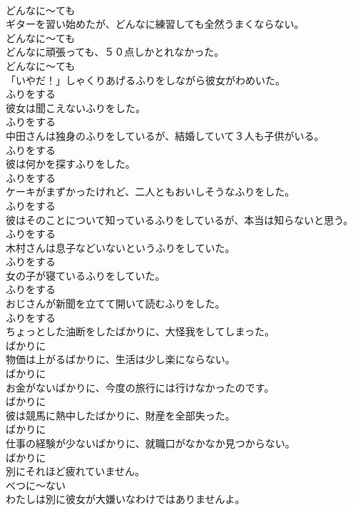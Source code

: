 \documentclass[8pt]{extreport}
\begin{document}
\begin{CJK}{UTF8}{min}
\\	どんなに～ても	
\\	ギターを習い始めたが、どんなに練習しても全然うまくならない。	
\\	どんなに～ても	
\\	どんなに頑張っても、５０点しかとれなかった。	
\\	どんなに～ても	
\\	「いやだ！」しゃくりあげるふりをしながら彼女がわめいた。	
\\	ふりをする	
\\	彼女は聞こえないふりをした。	
\\	ふりをする	
\\	中田さんは独身のふりをしているが、結婚していて３人も子供がいる。	
\\	ふりをする	
\\	彼は何かを探すふりをした。	
\\	ふりをする	
\\	ケーキがまずかったけれど、二人ともおいしそうなふりをした。	
\\	ふりをする	
\\	彼はそのことについて知っているふりをしているが、本当は知らないと思う。	
\\	ふりをする	
\\	木村さんは息子などいないというふりをしていた。	
\\	ふりをする	
\\	女の子が寝ているふりをしていた。	
\\	ふりをする	
\\	おじさんが新聞を立てて開いて読むふりをした。	
\\	ふりをする	
\\	ちょっとした油断をしたばかりに、大怪我をしてしまった。	
\\	ばかりに	
\\	物価は上がるばかりに、生活は少し楽にならない。	
\\	ばかりに	
\\	お金がないばかりに、今度の旅行には行けなかったのです。	
\\	ばかりに	
\\	彼は競馬に熱中したばかりに、財産を全部失った。	
\\	ばかりに	
\\	仕事の経験が少ないばかりに、就職口がなかなか見つからない。	
\\	ばかりに	
\\	別にそれほど疲れていません。	
\\	べつに～ない	
\\	わたしは別に彼女が大嫌いなわけではありませんよ。	

\end{CJK}
\end{document}

